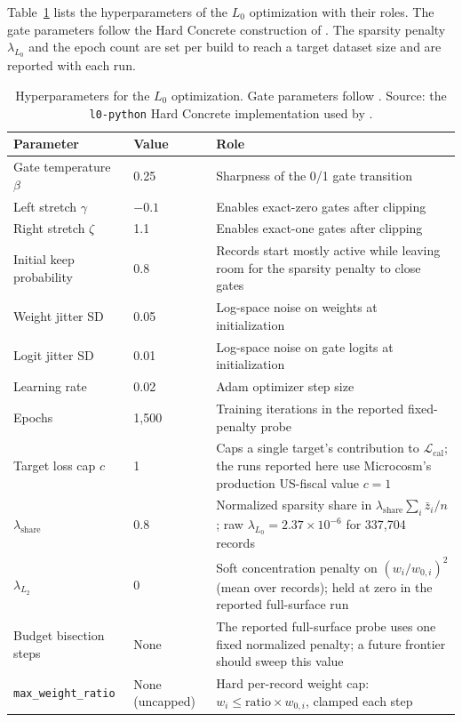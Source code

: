 Table~\ref{tab:hyperparameters_full} lists the hyperparameters of the $L_0$ optimization with their
roles. The gate parameters follow the Hard Concrete construction of \citet{louizos2018}. The
sparsity penalty $\lambda_{L_0}$ and the epoch count are set per build to reach a target dataset
size and are reported with each run.

\begin{table}[H]
\centering
{\tablefont
\begin{tabular}{@{}l l p{}@{}}
\toprule
Parameter & Value & Role \\
\midrule
Gate temperature $\beta$ & 0.25 & Sharpness of the 0/1 gate transition \\
Left stretch $\gamma$ & $-0.1$ & Enables exact-zero gates after clipping \\
Right stretch $\zeta$ & 1.1 & Enables exact-one gates after clipping \\
Initial keep probability & 0.8 & Records start mostly active while leaving room for the sparsity penalty to close gates \\
Weight jitter SD & 0.05 & Log-space noise on weights at initialization \\
Logit jitter SD & 0.01 & Log-space noise on gate logits at initialization \\
Learning rate & 0.02 & Adam optimizer step size \\
Epochs & 1{,}500 & Training iterations in the reported fixed-penalty probe \\
Target loss cap $c$ & 1 & Caps a single target's contribution to $\mathcal{L}_{\text{cal}}$; the runs reported here use Microcosm's production US-fiscal value $c=1$ \\
$\lambda_{\mathrm{share}}$ & 0.8 & Normalized sparsity share in $\lambda_{\mathrm{share}}\sum_i\bar{z}_i/n$; raw $\lambda_{L_0}=2.37\times10^{-6}$ for 337{,}704 records \\
$\lambda_{L_2}$ & $0$ & Soft concentration penalty on $(w_i/w_{0,i})^2$ (mean over records); held at zero in the reported full-surface run \\
Budget bisection steps & None & The reported full-surface probe uses one fixed normalized penalty; a future frontier should sweep this value \\
\texttt{max\_weight\_ratio} & None (uncapped) & Hard per-record weight cap: $w_i \leq \text{ratio}\times w_{0,i}$, clamped each step \\
\bottomrule
\end{tabular}
}
\caption{Hyperparameters for the $L_0$ optimization. Gate parameters follow \citet{louizos2018}.
Source: the \texttt{l0-python} Hard Concrete implementation used by \microcosm{}.}
\label{tab:hyperparameters_full}
\end{table}

